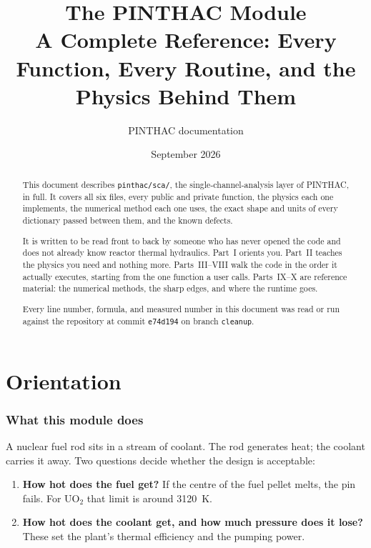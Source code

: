 \documentclass[11pt]{article}
\title{The PINTHAC \code{sca} Module\\
\large A Complete Reference: Every Function, Every Routine, and the Physics Behind Them}
\author{PINTHAC documentation}
\date{September 2026}
\newcommand{\code}[1]{\texttt{#1}}
\begin{document}
\maketitle

\begin{abstract}
\noindent
This document describes \code{pinthac/sca/}, the single-channel-analysis layer of
PINTHAC, in full. It covers all six files, every public and private function, the
physics each one implements, the numerical method each one uses, the exact shape and
units of every dictionary passed between them, and the known defects.

It is written to be read front to back by someone who has never opened the code and
does not already know reactor thermal hydraulics. Part~I orients you. Part~II teaches
the physics you need and nothing more. Parts~III--VIII walk the code in the order it
actually executes, starting from the one function a user calls. Parts~IX--X are
reference material: the numerical methods, the sharp edges, and where the runtime
goes.

Every line number, formula, and measured number in this document was read or run
against the repository at commit \code{e74d194} on branch \code{cleanup}.
\end{abstract}

\tableofcontents
\newpage

\part{Orientation}

\section{What this module does}

A nuclear fuel rod sits in a stream of coolant. The rod generates heat; the coolant
carries it away. Two questions decide whether the design is acceptable:

\begin{enumerate}[label=(\alph*)]
\item \textbf{How hot does the fuel get?} If the centre of the fuel pellet melts, the
      pin fails. For UO$_2$ that limit is around 3120~K.
\item \textbf{How hot does the coolant get, and how much pressure does it lose?} These
      set the plant's thermal efficiency and the pumping power.
\end{enumerate}
\end{document}
